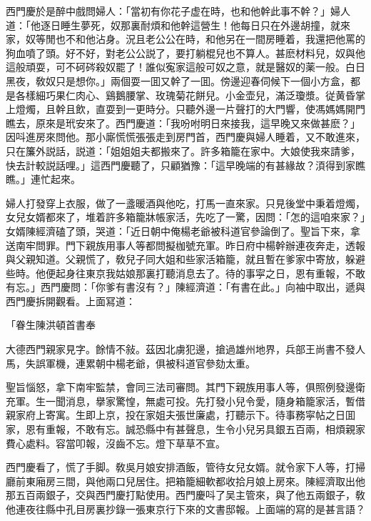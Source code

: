 西門慶於是醉中戲問婦人：「當初有你花子虚在時，也和他幹此事不幹？」婦人道：「他逐日睡生夢死，奴那裏耐煩和他幹這營生！他每日只在外邊胡撞，就來家，奴等閒也不和他沾身。況且老公公在時，和他另在一間房睡着，我還把他罵的狗血噴了頭。好不好，對老公公説了，要打躺棍兒也不算人。甚麽材料兒，奴與他這般頑耍，可不砢硶殺奴罷了！誰似寃家這般可奴之意，就是醫奴的薬一般。白日黑夜，敎奴只是想你。」兩個耍一囬又幹了一囬。傍邊迎春伺候下一個小方盒，都是各樣細巧果仁肉心、鷄鵝腰掌、玫瑰菊花餅兒。小金壶兒，滿泛瓊漿。従黄昏掌上燈燭，且幹且飲，直耍到一更時分。只聽外邊一片聲打的大門響，使馮媽媽開門瞧去，原來是玳安來了。西門慶道：「我吩咐明日來接我，這早晚又來做甚麽？」因呌進房來問他。那小廝慌慌張張走到房門首，西門慶與婦人睡着，又不敢進來，只在簾外説話，説道：「姐姐姐夫都搬來了。許多箱籠在家中。大娘使我來請爹，快去計較説話哩。」這西門慶聽了，只顧猶豫：「這早晚端的有甚緣故？湏得到家瞧瞧。」連忙起來。

婦人打發穿上衣服，做了一盞暖酒與他吃，打馬一直來家。只見後堂中秉着燈燭，女兒女婿都來了，堆着許多箱籠牀帳家活，先吃了一驚，因問：「怎的這咱來家？」女婿陳經濟磕了頭，哭道：「近日朝中俺楊老爺被科道官參論倒了。聖旨下來，拿送南牢問罪。門下親族用事人等都問擬枷號充軍。昨日府中楊幹辦連夜奔走，透報與父親知道。父親慌了，敎兒子同大姐和些家活箱籠，就且暫在爹家中寄放，躲避些時。他便起身往東京我姑娘那裏打聽消息去了。待的事寜之日，恩有重報，不敢有忘。」西門慶問：「你爹有書沒有？」陳經濟道：「有書在此。」向袖中取出，遞與西門慶拆開觀看。上面冩道：

\begin{myquote}[\markfont]
\hspace*{4em}「眷生陳洪頓首書奉

大德西門親家見字。餘情不敍。茲因北虜犯邊，搶過雄州地界，兵部王尚書不發人馬，失誤軍機，連累朝中楊老爺，俱被科道官參劾太重。

聖旨惱怒，拿下南牢監禁，會同三法司審問。其門下親族用事人等，俱照例發邊衛充軍。生一聞消息，擧家驚惶，無處可投。先打發小兒令愛，隨身箱籠家活，暫借親家府上寄寓。生即上京，投在家姐夫張世廉處，打聽示下。待事務寜帖之日囬家，恩有重報，不敢有忘。誠恐縣中有甚聲息，生令小兒另具銀五百兩，相煩親家費心處料。容當叩報，沒齒不忘。燈下草草不宣。

\end{myquote}

西門慶看了，慌了手脚。敎吳月娘安排酒飯，管待女兒女婿。就令家下人等，打掃廳前東廂房三間，與他兩口兒居住。把箱籠細軟都收拾月娘上房來。陳經濟取出他那五百兩銀子，交與西門慶打點使用。西門慶呌了吴主管來，與了他五兩銀子，敎他連夜往縣中孔目房裏抄錄一張東京行下來的文書邸報。上面端的寫的是甚言語？

